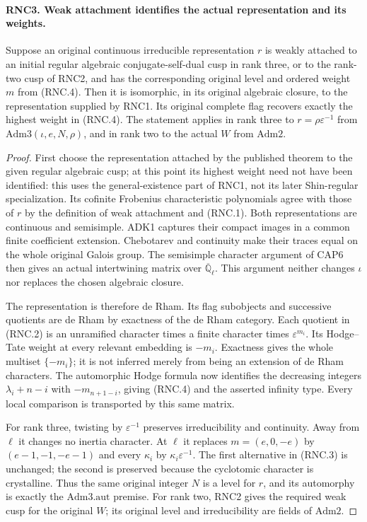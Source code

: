 \paragraph{RNC3. Weak attachment identifies the actual representation and its weights.}
\label{claim:RNC3}
Suppose an original continuous irreducible representation $r$
is weakly attached to an initial regular algebraic
conjugate-self-dual cusp in rank three, or to the rank-two
cusp of RNC2, and has the corresponding original level
and ordered weight $m$ from (RNC.4).  Then it
is isomorphic, in its original algebraic closure, to the
representation supplied by RNC1.  Its original complete flag
recovers exactly the highest weight in (RNC.4).  The statement
applies in rank three to $r=\rho\varepsilon^{-1}$ from
$\mathrm{Adm3}(\iota,e,N,\rho)$, and in rank two to the
actual $W$ from $\mathrm{Adm2}$.
\begin{proof}
First choose the representation attached by the published
theorem to the given regular algebraic cusp; at this point its
highest weight need not have been identified: this uses
the general-existence part of RNC1, not its later Shin-regular
specialization.  Its cofinite
Frobenius characteristic polynomials agree with those of $r$
by the definition of weak attachment and (RNC.1).
Both representations are continuous and semisimple.  ADK1
captures their compact images in a common finite coefficient
extension.  Chebotarev and continuity make their traces equal
on the whole original Galois group.  The semisimple character
argument of CAP6 then gives an actual intertwining matrix over
$\overline{\mathbb Q}_\ell$.  This argument neither changes
$\iota$ nor replaces the chosen algebraic closure.

The representation is therefore de Rham.  Its flag subobjects
and successive quotients are de Rham by exactness of the
de Rham category.  Each quotient in (RNC.2) is an unramified
character times a finite character times
$\varepsilon^{m_i}$.  Its Hodge--Tate weight at every relevant
embedding is $-m_i$.  Exactness gives the whole multiset
$\{-m_i\}$; it is not inferred merely from being an extension
of de Rham characters.  The automorphic Hodge formula now
identifies the decreasing integers $\lambda_i+n-i$ with
$-m_{n+1-i}$, giving (RNC.4) and the asserted infinity type.
Every local comparison is transported by this same matrix.

For rank three, twisting by $\varepsilon^{-1}$ preserves
irreducibility and continuity.  Away from $\ell$ it changes
no inertia character.  At $\ell$ it replaces $m=(e,0,-e)$
by $(e-1,-1,-e-1)$ and every $\kappa_i$ by
$\kappa_i\varepsilon^{-1}$.  The first alternative in
(RNC.3) is unchanged; the second is preserved because the
cyclotomic character is crystalline.  Thus the same original
integer $N$ is a level for $r$, and its automorphy is exactly
the $\mathrm{Adm3.aut}$ premise.  For rank two, RNC2 gives
the required weak cusp for the original $W$; its original
level and irreducibility are fields of $\mathrm{Adm2}$.
\end{proof}

